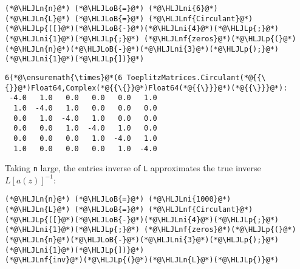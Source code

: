 \documentclass[12pt,landscape]{article}
\newcommand{\HLJLn}[1]{#1}
\newcommand{\HLJLnf}[1]{\textcolor[RGB]{66,102,213}{#1}}
\newcommand{\HLJLni}[1]{\textcolor[RGB]{59,151,46}{#1}}
\newcommand{\HLJLoB}[1]{\textcolor[RGB]{102,102,102}{\textbf{#1}}}
\newcommand{\HLJLp}[1]{#1}
\begin{document}
{\begin{lstlisting}
(*@\HLJLn{n}@*) (*@\HLJLoB{=}@*) (*@\HLJLni{6}@*)
(*@\HLJLn{L}@*) (*@\HLJLoB{=}@*) (*@\HLJLnf{Circulant}@*)(*@\HLJLp{([}@*)(*@\HLJLoB{-}@*)(*@\HLJLni{4}@*)(*@\HLJLp{;}@*) (*@\HLJLni{1}@*)(*@\HLJLp{;}@*) (*@\HLJLnf{zeros}@*)(*@\HLJLp{(}@*)(*@\HLJLn{n}@*)(*@\HLJLoB{-}@*)(*@\HLJLni{3}@*)(*@\HLJLp{);}@*) (*@\HLJLni{1}@*)(*@\HLJLp{])}@*)
\end{lstlisting}

\begin{lstlisting}
6(*@\ensuremath{\times}@*(6 ToeplitzMatrices.Circulant(*@{{\{}}@*)Float64,Complex(*@{{\{}}@*)Float64(*@{{\}}}@*)(*@{{\}}}@*):
 -4.0   1.0   0.0   0.0   0.0   1.0
  1.0  -4.0   1.0   0.0   0.0   0.0
  0.0   1.0  -4.0   1.0   0.0   0.0
  0.0   0.0   1.0  -4.0   1.0   0.0
  0.0   0.0   0.0   1.0  -4.0   1.0
  1.0   0.0   0.0   0.0   1.0  -4.0
\end{lstlisting}


Taking \texttt{n} large, the entries inverse of \texttt{L} approximates the true inverse $L[a(z)]^{-1}$:


\begin{lstlisting}
(*@\HLJLn{n}@*) (*@\HLJLoB{=}@*) (*@\HLJLni{1000}@*)
(*@\HLJLn{L}@*) (*@\HLJLoB{=}@*) (*@\HLJLnf{Circulant}@*)(*@\HLJLp{([}@*)(*@\HLJLoB{-}@*)(*@\HLJLni{4}@*)(*@\HLJLp{;}@*) (*@\HLJLni{1}@*)(*@\HLJLp{;}@*) (*@\HLJLnf{zeros}@*)(*@\HLJLp{(}@*)(*@\HLJLn{n}@*)(*@\HLJLoB{-}@*)(*@\HLJLni{3}@*)(*@\HLJLp{);}@*) (*@\HLJLni{1}@*)(*@\HLJLp{])}@*)
(*@\HLJLnf{inv}@*)(*@\HLJLp{(}@*)(*@\HLJLn{L}@*)(*@\HLJLp{)}@*)
\end{lstlisting}

}
\end{document}
